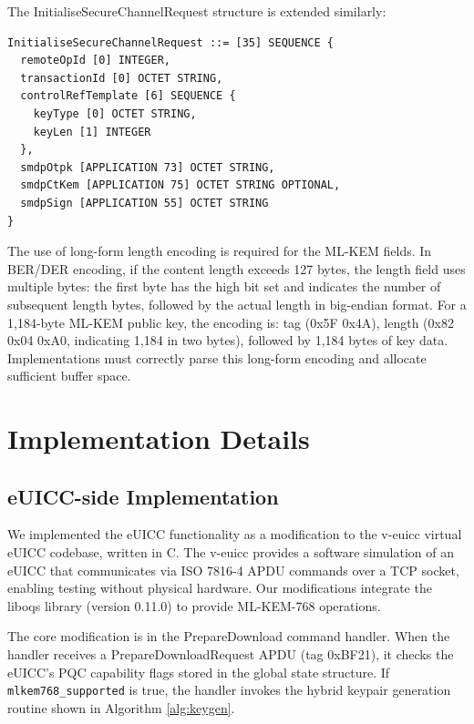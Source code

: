 \documentclass{easychair}
\begin{document}
The InitialiseSecureChannelRequest structure is extended similarly:

\begin{verbatim}
InitialiseSecureChannelRequest ::= [35] SEQUENCE {
  remoteOpId [0] INTEGER,
  transactionId [0] OCTET STRING,
  controlRefTemplate [6] SEQUENCE {
    keyType [0] OCTET STRING,
    keyLen [1] INTEGER
  },
  smdpOtpk [APPLICATION 73] OCTET STRING,
  smdpCtKem [APPLICATION 75] OCTET STRING OPTIONAL,
  smdpSign [APPLICATION 55] OCTET STRING
}
\end{verbatim}

The use of long-form length encoding is required for the ML-KEM fields. In BER/DER encoding, if the content length exceeds 127 bytes, the length field uses multiple bytes: the first byte has the high bit set and indicates the number of subsequent length bytes, followed by the actual length in big-endian format. For a 1,184-byte ML-KEM public key, the encoding is: tag (0x5F 0x4A), length (0x82 0x04 0xA0, indicating 1,184 in two bytes), followed by 1,184 bytes of key data. Implementations must correctly parse this long-form encoding and allocate sufficient buffer space.

\section{Implementation Details}

\subsection{eUICC-side Implementation}

We implemented the eUICC functionality as a modification to the v-euicc virtual eUICC codebase, written in C. The v-euicc provides a software simulation of an eUICC that communicates via ISO 7816-4 APDU commands over a TCP socket, enabling testing without physical hardware. Our modifications integrate the liboqs library (version 0.11.0) to provide ML-KEM-768 operations.

The core modification is in the PrepareDownload command handler. When the handler receives a PrepareDownloadRequest APDU (tag 0xBF21), it checks the eUICC's PQC capability flags stored in the global state structure. If \texttt{mlkem768\_supported} is true, the handler invokes the hybrid keypair generation routine shown in Algorithm \ref{alg:keygen}.
\end{document}
